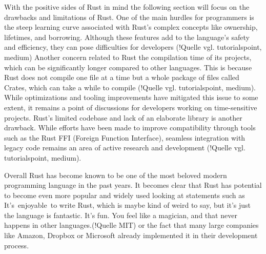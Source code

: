 With the positive sides of Rust in mind the following section will focus on the drawbacks and limitations of Rust. One of the main hurdles for programmers is the steep learning curve associated with Rust's complex concepts like ownership, lifetimes, and borrowing. Although these features add to the language's safety and efficiency, they can pose difficulties for developers (!Quelle vgl. tutorialspoint, medium)
Another concern related to Rust the compilation time of its projects, which can be significantly longer compared to other languages. This is because Rust does not compile one file at a time but a whole package of files called \dq Crates\dq, which can take a while to compile (!Quelle vgl. tutorialspoint, medium). While optimizations and tooling improvements have mitigated this issue to some extent, it remains a point of discussions for developers working on time-sensitive projects.
Rust's limited codebase and lack of an elaborate library is another drawback. While efforts have been made to improve compatibility through tools such as the Rust FFI (Foreign Function Interface), seamless integration with legacy code remains an area of active research and development (!Quelle vgl. tutorialspoint, medium).

Overall Rust has become known to be one of the most beloved modern programming language in the past years. It becomes clear that Rust has potential to become even more popular and widely used looking at statements such as 
\dq It’s enjoyable to write Rust, which is maybe kind of weird to say, but it’s just the language is fantastic. It’s fun. You feel like a magician, and that never happens in other languages.\dq (!Quelle MIT) or the fact that many large companies like Amazon, Dropbox or Microsoft already implemented it in their development process.